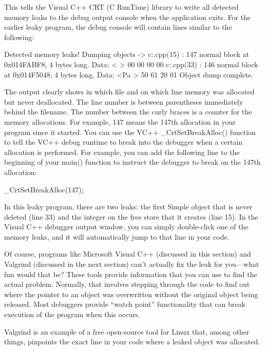 This tells the Visual C++ CRT (C RunTime) library to write all detected memory leaks to the debug output console when the application exits. For the earlier leaky program, the debug console will contain lines similar to the following:

\begin{shell}
Detected memory leaks!
Dumping objects ->
c:\leaky\leaky.cpp(15) : {147} normal block at 0x014FABF8, 4 bytes long.
 Data: < > 00 00 00 00
c:\leaky\leaky.cpp(33) : {146} normal block at 0x014F5048, 4 bytes long.
 Data: <Pa > 50 61 20 01
Object dump complete.
\end{shell}

The output clearly shows in which file and on which line memory was allocated but never deallocated. The line number is between parentheses immediately behind the filename. The number between the curly braces is a counter for the memory allocations. For example, {147} means the 147th allocation in your program since it started. You can use the VC++ \_CrtSetBreakAlloc() function to tell the VC++ debug runtime to break into the debugger when a certain allocation is performed. For example, you can add the following line to the beginning of your main() function to instruct the debugger to break on the 147th allocation:

\begin{cpp}
_CrtSetBreakAlloc(147);
\end{cpp}

In this leaky program, there are two leaks: the first Simple object that is never deleted (line 33) and the integer on the free store that it creates (line 15). In the Visual C++ debugger output window, you can simply double-click one of the memory leaks, and it will automatically jump to that line in your code.

Of course, programs like Microsoft Visual C++ (discussed in this section) and Valgrind (discussed in the next section) can’t actually fix the leak for you—what fun would that be? These tools provide information that you can use to find the actual problem. Normally, that involves stepping through the code to find out where the pointer to an object was overwritten without the original object being released. Most debuggers provide “watch point” functionality that can break execution of the program when this occurs.


Valgrind is an example of a free open-source tool for Linux that, among other things, pinpoints the exact line in your code where a leaked object was allocated.

